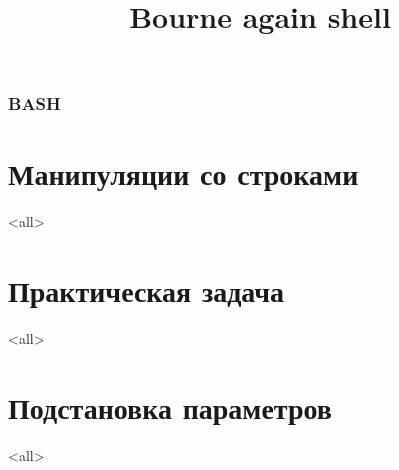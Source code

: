 
\title[bash]{Bourne again shell}




\begin{frame}
	\frametitle{BASH}
	\titlepage
	\vspace{-0.5cm}
	\begin{center}
	\end{center}
\end{frame}

\begin{frame}
	\tableofcontents
\end{frame}




\section{Манипуляции со строками}

\mode<all>{}

\section{Практическая задача}

\mode<all>{}

\section{Подстановка параметров}

\mode<all>{}



